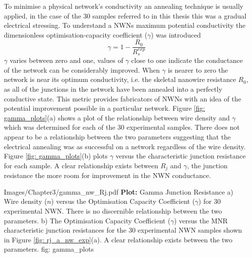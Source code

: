 To minimise a physical network's conductivity an annealing technique is usually applied, in the case of the 30 samples referred to in this thesis this was a gradual electrical stressing\cite{rocha2015}. To understand a NWNs maximum potential conductivity the dimensionless optimisation-capacity coefficient ($\gamma$) was introduced 
\begin{equation}
\gamma = 1 - \frac{R_0}{R_s^{exp}}
\end{equation}
$\gamma$ varies between zero and one, values of $\gamma$ close to one indicate the conductance of the network can be considerably improved. When $\gamma$ is nearer to zero the network is near its optimum conductivity, i.e. the skeletal nanowire resistance $R_0$, as all of the junctions in the network have been annealed into a perfectly conductive state. This metric provides fabricators of NWNs with an idea of the potential improvement possible in a particular network. Figure \ref{fig: gamma_plots}(a) shows a plot of the relationship between wire density and $\gamma$ which was determined for each of the 30 experimental samples. There does not appear to be a relationship between the two parameters suggesting that the electrical annealing was as successful on a network regardless of the wire density. Figure \ref{fig: gamma_plots}(b) plots $\gamma$ versus the characteristic junction resistance for each sample. A clear relationship exists between $R_j$ and $\gamma$, the junction resistance the more room for improvement in the NWN conductance.

{Images/Chapter3/gamma_nw_Rj.pdf}
{\textbf{Plot:} Gamma Junction Resistance}
{a) Wire density ($n$) versus the Optimisation Capacity Coefficient ($\gamma$) for 30 experimental NWN. There is no discernible relationship between the two parameters. b) The Optimisation Capacity Coefficient ($\gamma$) versus the MNR characteristic junction resistances for the 30 experimental NWN samples shown in Figure \ref{fig: rj_a_nw_exp}(a). A clear relationship exists between the two parameters.}
{fig: gamma_plots}

